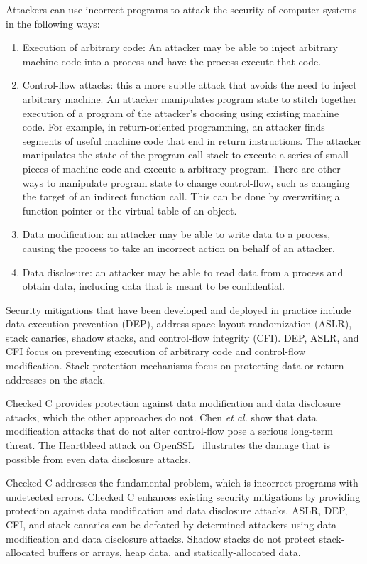 Attackers can use incorrect programs to attack the security of 
computer systems in the following ways:
\begin{enumerate}
\item  Execution of arbitrary code: An attacker may be able to inject arbitrary machine code into a process and have the process  execute that code.
\item Control-flow attacks: this a more subtle attack that avoids the need to inject arbitrary machine.  An attacker manipulates program state to
stitch together execution of a program of the attacker's choosing
using existing machine code.
For example, in return-oriented programming, an attacker finds segments of useful
machine code that end in return instructions. The attacker manipulates the state of 
the program call  stack to execute a series of small pieces of machine code and execute
a arbitrary program.  There are other ways to manipulate program state to
change control-flow, such as changing the target of an indirect function call.  
This can be done by 
overwriting a function pointer or the virtual table of an object.
\item Data modification: an attacker may be able to write data to a process, causing the process to take an incorrect action on behalf of an attacker.
\item  Data disclosure: an attacker may be able to read data from a process 
and obtain data, including data that is meant to be confidential.  
\end{enumerate}

Security mitigations that have been developed and deployed in
practice include data execution prevention (DEP), 
address-space layout randomization (ASLR), stack canaries,
shadow stacks, and control-flow integrity (CFI).   DEP, ASLR, and CFI focus
on preventing execution of arbitrary code and control-flow modification.  
Stack protection mechanisms focus on protecting data or return addresses
on the stack. 

Checked C provides protection against data modification and
data disclosure attacks, which the other approaches do not.
Chen {\it et al.} \cite{Chen2005} show that data modification
attacks that do not alter control-flow pose a serious long-term threat.
The Heartbleed attack on OpenSSL~\cite{Heartbleed} illustrates the damage that
is possible from even data disclosure attacks.

Checked C addresses the fundamental problem, which is incorrect programs
with undetected errors. Checked C enhances existing security mitigations by
providing protection against data modification and data disclosure attacks.
ASLR, DEP, CFI, and stack canaries can be 
defeated by determined attackers using data modification and data disclosure
attacks.  Shadow stacks do not protect stack-allocated buffers or arrays, 
heap data, and statically-allocated data.

